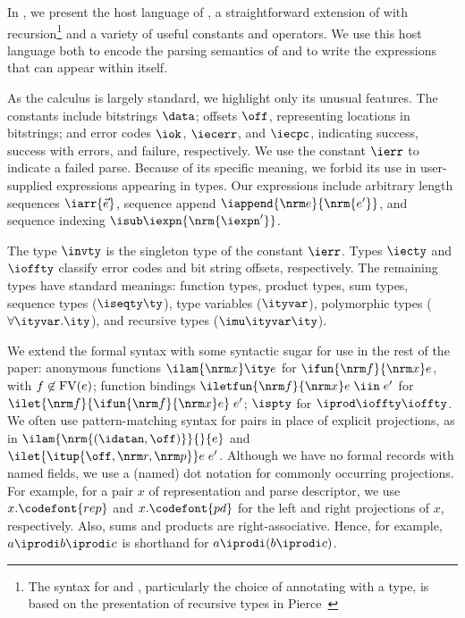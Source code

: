 In , we present the host language of
\ddc{}, a straightforward extension of \fomega{} with
recursion\footnote{The syntax for  and ,
  particularly the choice of annotating  with a type, is
  based on the presentation of recursive types in Pierce~\cite{pierce:tapl}} and a
variety of useful constants and operators. 
We use this host language both to encode the parsing semantics of
\ddc{} and to write the expressions that can appear within \ddc{}
itself.

As the calculus is largely standard, we highlight only its unusual
features. The constants include bitstrings $\data$; offsets $\off$,
representing locations in bitstrings; and error codes $\iok$,
$\iecerr$, and $\iecpc$, indicating success, success with errors, and
failure, respectively. We use the constant $\ierr$ to indicate a
failed parse.  Because of its specific meaning, we forbid its use in
user-supplied expressions appearing in \ddc{} types.
Our expressions include arbitrary length
sequences $\iarr{\vec e}$, sequence append $\iappend {\nrm e}
{\nrm {e'}}$, and sequence indexing $\isub \iexpn {\nrm {\iexpn'}}$.

The type $\invty$ is the singleton type of the constant $\ierr$.
Types $\iecty$ and $\ioffty$ classify error codes and bit string
offsets, respectively. The remaining types have standard meanings:
function types, product types, sum types, sequence types ($\iseqty
\ty$), type variables ($\ityvar$), polymorphic types ($\forall
\ityvar.\ity$), and recursive types ($\imu \ityvar \ity$).

We extend the formal syntax with some syntactic sugar for use in the
rest of the paper: anonymous functions $\ilam {\nrm x} \ity e$ for
$\ifun {\nrm f} {\nrm x} e$, with $f \not\in {\rm FV}(e)$; function
bindings $\iletfun {\nrm f} {\nrm x} e \; \iin \; e'$ for $\ilet {\nrm
  f} {\ifun {\nrm f} {\nrm x} e} \; e'$; $\ispty$ for $\iprod \ioffty
\ioffty$.  
We often use pattern-matching syntax for pairs in place of
explicit projections, as in $\ilam {\nrm{(\idatan,\off)}}{}{e}$ and $\ilet
{\itup{\off,\nrm r,\nrm p}} e\; e'$.  Although we have no formal records with
named fields, we use a (named) dot notation for commonly occurring projections.
For example, for a pair $x$ of representation and parse descriptor, we use
$x.\codefont{rep}$ and $x.\codefont{pd}$ for the left and right
projections of $x$, respectively.  Also, sums and products are
right-associative. Hence, for example, $a \iprodi b \iprodi c$ is
shorthand for $a \iprodi (b \iprodi c)$.

